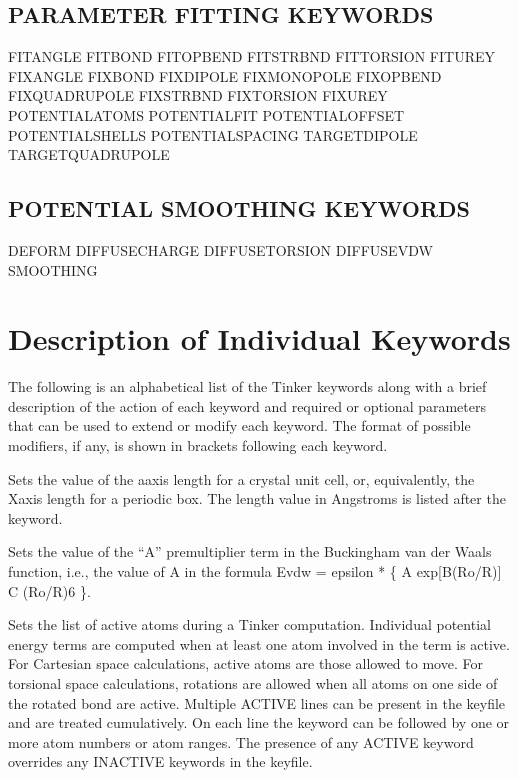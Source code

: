 \documentclass[letterpaper,11pt,english]{sphinxmanual}
\begin{document}
\subsection{PARAMETER FITTING KEYWORDS}
\label{\detokenize{text/keywords:parameter-fitting-keywords}}
FIT\sphinxhyphen{}ANGLE       FIT\sphinxhyphen{}BOND        FIT\sphinxhyphen{}OPBEND
FIT\sphinxhyphen{}STRBND      FIT\sphinxhyphen{}TORSION     FIT\sphinxhyphen{}UREY
FIX\sphinxhyphen{}ANGLE       FIX\sphinxhyphen{}BOND        FIX\sphinxhyphen{}DIPOLE
FIX\sphinxhyphen{}MONOPOLE    FIX\sphinxhyphen{}OPBEND      FIX\sphinxhyphen{}QUADRUPOLE
FIX\sphinxhyphen{}STRBND      FIX\sphinxhyphen{}TORSION     FIX\sphinxhyphen{}UREY
POTENTIAL\sphinxhyphen{}ATOMS POTENTIAL\sphinxhyphen{}FIT   POTENTIAL\sphinxhyphen{}OFFSET
POTENTIAL\sphinxhyphen{}SHELLS        POTENTIAL\sphinxhyphen{}SPACING       TARGET\sphinxhyphen{}DIPOLE
TARGET\sphinxhyphen{}QUADRUPOLE


\subsection{POTENTIAL SMOOTHING KEYWORDS}
\label{\detokenize{text/keywords:potential-smoothing-keywords}}
DEFORM  DIFFUSE\sphinxhyphen{}CHARGE  DIFFUSE\sphinxhyphen{}TORSION
DIFFUSE\sphinxhyphen{}VDW     SMOOTHING


\section{Description of Individual Keywords}
\label{\detokenize{text/keywords:description-of-individual-keywords}}
The following is an alphabetical list of the Tinker keywords along with a brief description of the action of each keyword and required or optional parameters that can be used to extend or modify each keyword. The format of possible modifiers, if any, is shown in brackets following each keyword.

  Sets the value of the a\sphinxhyphen{}axis length for a crystal unit cell, or, equivalently, the X\sphinxhyphen{}axis length for a periodic box. The length value in Angstroms is listed after the keyword.

  Sets the value of the “A” premultiplier term in the Buckingham van der Waals function, i.e., the value of A in the formula Evdw = epsilon * \{ A exp{[}\sphinxhyphen{}B(Ro/R){]} \sphinxhyphen{} C (Ro/R)6 \}.

  Sets the list of active atoms during a Tinker computation. Individual potential energy terms are computed when at least one atom involved in the term is active. For Cartesian space calculations, active atoms are those allowed to move. For torsional space calculations, rotations are allowed when all atoms on one side of the rotated bond are active. Multiple ACTIVE lines can be present in the keyfile and are treated cumulatively.  On each line the keyword can be followed by one or more atom numbers or atom ranges. The presence of any ACTIVE keyword overrides any INACTIVE keywords in the keyfile.
\end{document}
